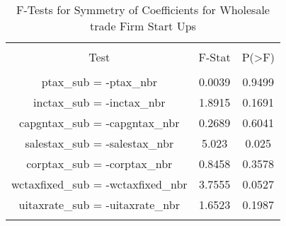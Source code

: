 
\begin{table}[!htbp] \centering 
  \caption{F-Tests for Symmetry of Coefficients for Wholesale trade Firm Start Ups} 
  \label{42Ftests} 
\begin{tabular}{@{\extracolsep{5pt}} ccc} 
\\[-1.8ex]\hline 
\hline \\[-1.8ex] 
Test & F-Stat & P(\textgreater F) \\ 
\hline \\[-1.8ex] 
ptax\_sub = -ptax\_nbr & 0.0039 & 0.9499 \\ 
inctax\_sub = -inctax\_nbr & 1.8915 & 0.1691 \\ 
capgntax\_sub = -capgntax\_nbr & 0.2689 & 0.6041 \\ 
salestax\_sub = -salestax\_nbr & 5.023 & 0.025 \\ 
corptax\_sub = -corptax\_nbr & 0.8458 & 0.3578 \\ 
wctaxfixed\_sub = -wctaxfixed\_nbr & 3.7555 & 0.0527 \\ 
uitaxrate\_sub = -uitaxrate\_nbr & 1.6523 & 0.1987 \\ 
\hline \\[-1.8ex] 
\end{tabular} 
\end{table} 
